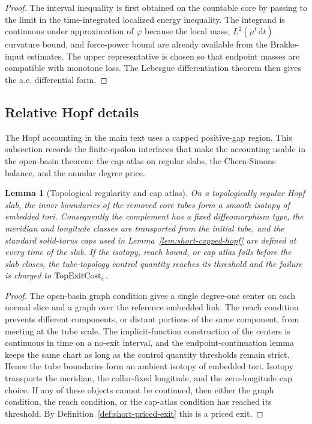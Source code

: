 \documentclass[11pt]{article}
\newtheorem{lemma}[theorem]{Lemma}
\theoremstyle{definition}
\newcommand{\dd}{\,\mathrm d}
\newcommand{\eps}{\varepsilon}
\begin{document}
\begin{proof}
The interval inequality is first obtained on the countable core by passing to
the limit in the time-integrated localized energy inequality.  The integrand is
continuous under approximation of \(\varphi\) because the local mass,
\(L^2(\mu^t\dd t)\) curvature bound, and force-power bound are already
available from the Brakke-input estimates.  The upper representative is chosen so
that endpoint masses are compatible with monotone loss.  The Lebesgue
differentiation theorem then gives the a.e. differential form.
\end{proof}

\subsection{Relative Hopf details}

The Hopf accounting in the main text uses a capped positive-gap region.  This
subsection records the finite-epsilon interfaces that make the accounting
usable in the open-basin theorem: the cap atlas on regular slabs, the
Chern-Simons balance, and the annular degree price.

\begin{lemma}[Topological regularity and cap atlas]
\label{lem:app-cap-atlas}
On a topologically regular Hopf slab, the inner boundaries of the removed core
tubes form a smooth isotopy of embedded tori.  Consequently the complement has
a fixed diffeomorphism type, the meridian and longitude classes are transported
from the initial tube, and the standard solid-torus caps used in
Lemma~\ref{lem:short-capped-hopf} are defined at every time of the slab.  If
the isotopy, reach bound, or cap atlas fails before the slab closes, the
tube-topology control quantity reaches its threshold and the failure is charged to
\({\rm TopExitCost}_\eps\).
\end{lemma}

\begin{proof}
The open-basin graph condition gives a single degree-one center on each normal
slice and a graph over the reference embedded link.  The reach condition prevents
different components, or distant portions of the same component, from meeting
at the tube scale.  The implicit-function construction of the centers is
continuous in time on a no-exit interval, and the endpoint-continuation lemma
keeps the same chart as long as the control quantity thresholds remain strict.  Hence the
tube boundaries form an ambient isotopy of embedded tori.  Isotopy transports
the meridian, the collar-fixed longitude, and the zero-longitude cap choice.
If any of these objects cannot be continued, then either the graph condition, the
reach condition, or the cap-atlas condition has reached its threshold.  By
Definition~\ref{def:short-priced-exit} this is a priced exit.
\end{proof}
\end{document}
